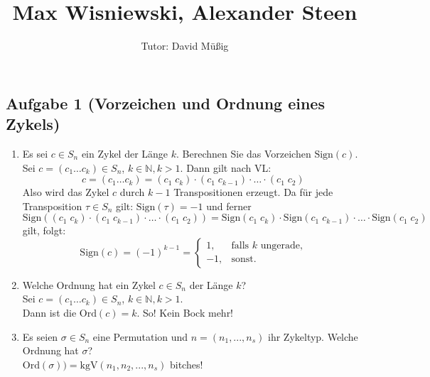 \documentclass[11pt,a4paper,ngerman]{article}
\author{Tutor: David Müßig}
\date{}
\title{Max Wisniewski, Alexander Steen}
\newcommand{\N}{\mathbb{N}}
\newcommand{\kgV}{\text{kgV}}
\newcommand{\sign}{\text{Sign}}
\newcommand{\ord}{\text{Ord}}
\begin{document}

\maketitle
\thispagestyle{fancy}


\subsection*{Aufgabe 1 \mdseries (Vorzeichen und Ordnung eines Zykels)}
\begin{enumerate}[\bfseries a)]
\item Es sei $c \in S_n$ ein Zykel der Länge $k$. Berechnen Sie das Vorzeichen $\sign(c)$. \\

Sei $c = (c_1 \ldots c_k) \in S_n$, $k \in \N,k > 1$. Dann gilt nach VL:
$$ c = (c_1 \ldots c_k) = (c_1 \; c_k) \cdot (c_1 \; c_{k-1}) \cdot \ldots \cdot (c_1 \; c_2)$$
Also wird das Zykel $c$ durch $k-1$ Transpositionen erzeugt. Da für jede Transposition $\tau \in S_n$ gilt: $\sign(\tau) = -1$ und ferner
$$ \sign((c_1 \; c_k) \cdot (c_1 \; c_{k-1}) \cdot \ldots \cdot (c_1 \; c_2)) = \sign(c_1 \; c_k) \cdot \sign(c_1 \; c_{k-1}) \cdot \ldots \cdot \sign(c_1 \; c_2)$$
gilt, folgt:
$$ \sign(c) = (-1)^{k-1} = \begin{cases}
  1,  & \text{falls }k\text{ ungerade,}\\
  -1, & \text{sonst.}
\end{cases} $$
\item  Welche Ordnung hat ein Zykel $c \in S_n$ der Länge $k$? \\

Sei $c = (c_1 \ldots c_k) \in S_n$, $k \in \N,k > 1$. \\
Dann ist die $\ord(c) = k$. So! Kein Bock mehr!
\item Es seien $\sigma \in S_n$ eine Permutation und $n=(n_1,...,n_s)$ ihr Zykeltyp. Welche Ordnung hat $\sigma$? \\
$\ord(\sigma)) = \kgV(n_1, n_2, ..., n_s)$ bitches!
\end{enumerate}
\end{document}
